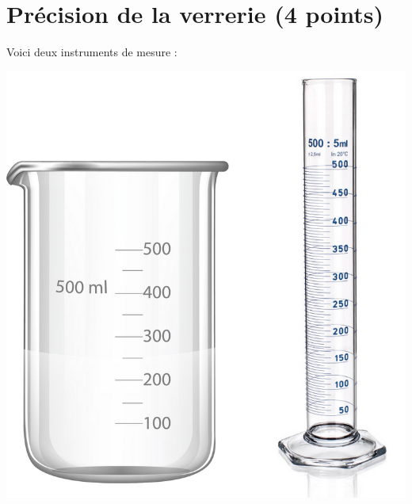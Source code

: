 \section{Précision de la verrerie (4 points)}

Voici deux instruments de mesure :

\begin{center}
	\includegraphics[scale=0.4]{img/vol}
\end{center}

